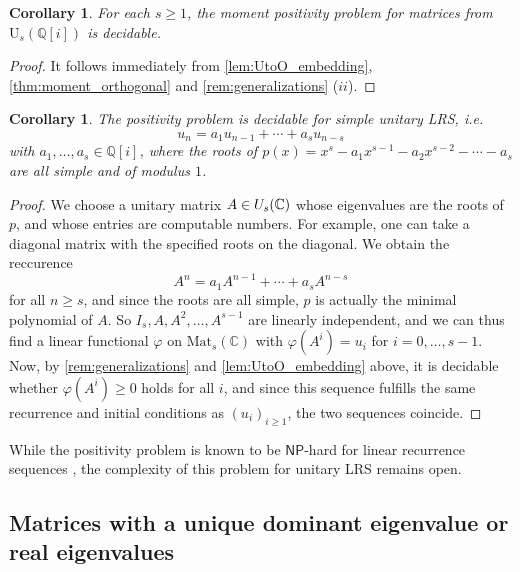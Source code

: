 \documentclass[11pt]{article}
\newtheorem{corollary}[theorem]{Corollary}
\theoremstyle{definition}
\newcommand{\Mat}{\mathrm{Mat}}
\newcommand{\NP}{\mathsf{NP}}
\begin{document}
\begin{corollary}
\label{cor:moment_unitary}
For each $s\geqslant 1$, the moment positivity problem for matrices from $\mathrm{U}_s(\mathbb Q[i])$ is decidable.
\end{corollary}
\begin{proof}
It follows immediately from \cref{lem:UtoO_embedding}, \cref{thm:moment_orthogonal} and \cref{rem:generalizations} ($ii$).
\end{proof}


\begin{corollary}
The positivity problem is decidable for simple unitary LRS, i.e.\
$$
u_n = a_1 u_{n-1} + \cdots + a_s u_{n-s}
$$
with $a_1, \ldots, a_s \in \mathbb{Q}[i]$, where the roots of $p(x) = x^s - a_1 x^{s-1} - a_2 x^{s-2} - \cdots - a_{s}$
are all simple and of modulus $1$.
\end{corollary}
\begin{proof}
We choose a unitary matrix $A\in{\rm U}_s(\mathbb C)$ whose eigenvalues are the roots of $p$, and whose entries are computable numbers. For example, one can take a diagonal matrix with the specified roots on the diagonal. We obtain the reccurence $$A^n=a_1A^{n-1}+\cdots + a_s A^{n-s}$$ for all $n\geqslant s$, and since the roots are all simple, $p$ is actually the minimal polynomial of $A$. So $I_s,A,A^2,\ldots, A^{s-1}$ are linearly independent, and we can thus find a linear functional $\varphi$ on $\Mat_s(\mathbb C)$ with $\varphi(A^i)=u_i$ for $i=0,\ldots, s-1$. Now, by \cref{rem:generalizations} and \cref{lem:UtoO_embedding} above, it is decidable whether $\varphi(A^i)\geqslant 0$ holds for all $i$, and since this sequence fulfills the same  recurrence and initial conditions as $(u_i)_{i\geqslant 1}$, the two sequences coincide.\end{proof}

While the positivity problem is known to be $\NP$-hard for linear recurrence sequences \cite{Bl01}, the complexity of this problem for unitary LRS remains open.


\subsection{Matrices with a unique dominant eigenvalue or real eigenvalues}
\label{ssec:largestEigenvalue}
\end{document}
